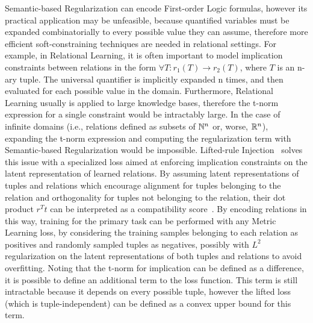 Semantic-based Regularization can encode First-order Logic formulas, however its practical application may be unfeasible, because quantified variables must be expanded combinatorially to every possible value they can assume, therefore more efficient soft-constraining techniques are needed in relational settings.
For example, in Relational Learning, it is often important to model implication constraints between relations in the form $\forall T: r_1(T) \rightarrow r_2(T)$, where $T$ is an n-ary tuple. The universal quantifier is implicitly expanded n times, and then evaluated for each possible value in the domain. Furthermore, Relational Learning usually is applied to large knowledge bases, therefore the t-norm expression for a single constraint would be intractably large. In the case of infinite domains (i.e., relations defined as subsets of ${\mathbb{N}}^n$ or, worse, $\mathbb{R}^n$), expanding the t-norm expression and computing the regularization term with Semantic-based Regularization would be impossible.
%
Lifted-rule Injection~\cite{demeester2016lifted} solves this issue with a specialized loss aimed at enforcing implication constraints on the latent representation of learned relations.
By assuming latent representations of tuples and relations which encourage alignment for tuples belonging to the relation and orthogonality for tuples not belonging to the relation, their dot product $r^Tt$ can be interpreted as a compatibility score~\cite{riedel2013relation}.%
By encoding relations in this way, training for the primary task can be performed with any Metric Learning loss, by considering the training samples belonging to each relation as positives and randomly sampled tuples as negatives, possibly with $L^2$ regularization on the latent representations of both tuples and relations to avoid overfitting.
Noting that the t-norm for implication can be defined as a difference, it is possible to define an additional term to the loss function. This term is still intractable because it depends on every possible tuple, however the lifted loss (which is tuple-independent) can be defined as a convex upper bound for this term.
